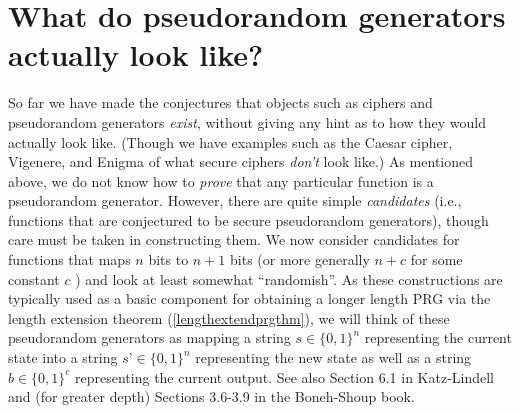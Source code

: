 \hypertarget{cointossingphonerm}{}

\section{What do pseudorandom generators actually look
like?}\label{What-do-pseudorandom-generator}

So far we have made the conjectures that objects such as ciphers and
pseudorandom generators \emph{exist}, without giving any hint as to how
they would actually look like. (Though we have examples such as the
Caesar cipher, Vigenere, and Enigma of what secure ciphers \emph{don't}
look like.) As mentioned above, we do not know how to \emph{prove} that
any particular function is a pseudorandom generator. However, there are
quite simple \emph{candidates} (i.e., functions that are conjectured to
be secure pseudorandom generators), though care must be taken in
constructing them. We now consider candidates for functions that maps
\(n\) bits to \(n+1\) bits (or more generally \(n+c\) for some constant
\(c\) ) and look at least somewhat ``randomish''. As these constructions
are typically used as a basic component for obtaining a longer length
PRG via the length extension theorem (\cref{lengthextendprgthm}), we
will think of these pseudorandom generators as mapping a string
\(s\in\{0,1\}^n\) representing the current state into a string
\(s’\in\{0,1\}^n\) representing the new state as well as a string
\(b\in\{0,1\}^c\) representing the current output. See also Section 6.1
in Katz-Lindell and (for greater depth) Sections 3.6-3.9 in the
Boneh-Shoup book.

